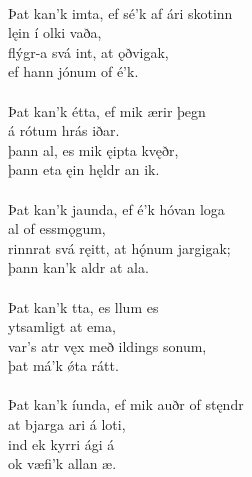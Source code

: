  \\

\bva Þat kan'k imta, \hld ef sé'k af ári skotinn \\%
\ind {}lęin í olki vaða, \\%
flýgr-a svá int, \hld at ǫðvigak, \\%
\ind ef hann jónum of é'k.\\%

 \\

\bva Þat kan'k étta, \hld ef mik ærir þegn \\%
\ind á rótum hrás iðar. \\%
þann al, \hld es mik ęipta kvęðr, \\%
\ind þann eta ęin hęldr an ik.\\%

 \\

\bva Þat kan'k jaunda, \hld ef é'k hóvan loga \\%
\ind {}al of essmǫgum, \\%
rinnrat svá ręitt, \hld at hǫ́num jargigak; \\%
\ind þann kan'k aldr at ala.\\%

 \\

\bva Þat kan'k tta, \hld es llum es \\%
\ind {}ytsamligt at ema, \\%
var's atr vęx \hld með ildings sonum, \\%
\ind þat má'k ǿta rátt.\\%

 \\

\bva Þat kan'k íunda, \hld ef mik auðr of stęndr \\%
\ind at bjarga ari á loti, \\%
ind ek kyrri \hld {}ági á \\%
\ind ok væfi'k allan æ.\\%

 \\

